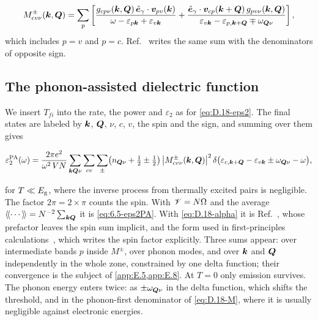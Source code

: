\begin{equation}
  M^{\pm}_{cv\nu}(\bm{k},\bm{Q}) = \sum_p\left[\frac{g_{cp\nu}(\bm{k},\bm{Q})\,\hat{\bm{e}}_\gamma\cdot\bm{v}_{pv}(\bm{k})}{\omega - \varepsilon_{p\bm{k}} + \varepsilon_{v\bm{k}}} + \frac{\hat{\bm{e}}_\gamma\cdot\bm{v}_{cp}(\bm{k}+\bm{Q})\,g_{pv\nu}(\bm{k},\bm{Q})}{\varepsilon_{v\bm{k}} - \varepsilon_{p,\bm{k}+\bm{Q}} \mp \omega_{\bm{Q}\nu}}\right] ,
  \label{eq:D.18-M}
\end{equation}
which includes $p = v$ and $p = c$. Ref.~\cite[Eq.~(200)]{giustino2017electron} writes the same sum with the denominators of opposite sign.

\subsection*{The phonon-assisted dielectric function}

We insert $T_{fi}$ into the rate, the power and $\varepsilon_2$ as for \cref{eq:D.18-eps2}. The final states are labeled by $\bm{k}$, $\bm{Q}$, $\nu$, $c$, $v$, the spin and the sign, and summing over them gives
\begin{keyresult}
\begin{equation}
  \varepsilon_2^{\mathrm{PA}}(\omega) = \frac{2\pi e^2}{\omega^2\,VN}\sum_{\bm{k}\bm{Q}\nu}\sum_{cv}\sum_\pm\bigl(n_{\bm{Q}\nu} + \tfrac12 \pm \tfrac12\bigr)\,\bigl|M^{\pm}_{cv\nu}(\bm{k},\bm{Q})\bigr|^2\,\delta\bigl(\varepsilon_{c,\bm{k}+\bm{Q}} - \varepsilon_{v\bm{k}} \pm \omega_{\bm{Q}\nu} - \omega\bigr) ,
  \label{eq:D.18-eps2PA}
\end{equation}
\end{keyresult}
for $T \ll E_{\mathrm{g}}$, where the inverse process from thermally excited pairs is negligible. The factor $2\pi = 2\times\pi$ counts the spin. With $\mathscr{V} = N\Omega$ and the average $\langle\!\langle\cdots\rangle\!\rangle = N^{-2}\sum_{\bm{k}\bm{Q}}$ it is \cref{eq:6.5-eps2PA}. With \cref{eq:D.18-alpha} it is Ref.~\cite[Eq.~(200)]{giustino2017electron}, whose prefactor leaves the spin sum implicit, and the form used in first-principles calculations~\cite[Eq.~(1)]{noffsinger2012phonon}, which writes the spin factor explicitly. Three sums appear: over intermediate bands $p$ inside $M^\pm$, over phonon modes, and over $\bm{k}$ and $\bm{Q}$ independently in the whole zone, constrained by one delta function; their convergence is the subject of \cref{app:E.5,app:E.8}. At $T = 0$ only emission survives. The phonon energy enters twice: as $\pm\omega_{\bm{Q}\nu}$ in the delta function, which shifts the threshold, and in the phonon-first denominator of \cref{eq:D.18-M}, where it is usually negligible against electronic energies.

